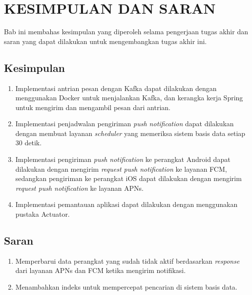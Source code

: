 \chapter{KESIMPULAN DAN SARAN}
\par Bab ini membahas kesimpulan yang diperoleh selama pengerjaan tugas akhir dan saran yang dapat dilakukan untuk mengembangkan tugas akhir ini.

\section{Kesimpulan}
\begin{enumerate}
	\item Implementasi antrian pesan dengan Kafka dapat dilakukan dengan menggunakan Docker untuk menjalankan Kafka, dan kerangka kerja Spring untuk mengirim dan mengambil pesan dari antrian.
	\item Implementasi penjadwalan pengiriman \textit{push notification} dapat dilakukan dengan membuat layanan \textit{scheduler} yang memeriksa sistem basis data setiap 30 detik.
	\item Implementasi pengiriman \textit{push notification} ke perangkat Android dapat dilakukan dengan mengirim \textit{request push notification} ke layanan FCM, sedangkan pengiriman ke perangkat iOS dapat dilakukan dengan mengirim \textit{request push notification} ke layanan APNs.
	\item Implementasi pemantauan aplikasi dapat dilakukan dengan menggunakan pustaka Actuator.
\end{enumerate}

\section{Saran}
\begin{enumerate}
    \item Memperbarui data perangkat yang sudah tidak aktif berdasarkan \textit{response} dari layanan APNs dan FCM ketika mengirim notifikasi.
    \item Menambahkan indeks untuk mempercepat pencarian di sistem basis data.
\end{enumerate}
